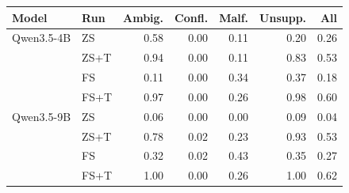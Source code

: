\begin{tabular}{llrrrrr}
\toprule
Model & Run & Ambig. & Confl. & Malf. & Unsupp. & All \\
\midrule
Qwen3.5-4B & ZS & 0.58 & 0.00 & 0.11 & 0.20 & 0.26 \\
 & ZS+T & 0.94 & 0.00 & 0.11 & 0.83 & 0.53 \\
 & FS & 0.11 & 0.00 & 0.34 & 0.37 & 0.18 \\
 & FS+T & 0.97 & 0.00 & 0.26 & 0.98 & 0.60 \\
\midrule
Qwen3.5-9B & ZS & 0.06 & 0.00 & 0.00 & 0.09 & 0.04 \\
 & ZS+T & 0.78 & 0.02 & 0.23 & 0.93 & 0.53 \\
 & FS & 0.32 & 0.02 & 0.43 & 0.35 & 0.27 \\
 & FS+T & 1.00 & 0.00 & 0.26 & 1.00 & 0.62 \\
\bottomrule
\end{tabular}
